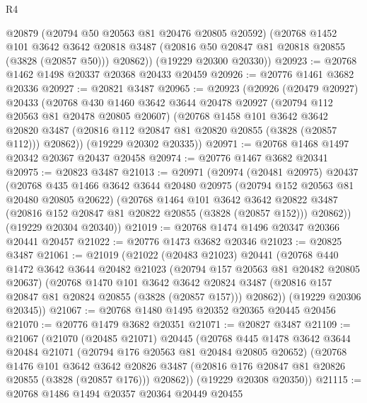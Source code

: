 \begin{lexlean}{R4}
\begin{coremodule}
        @20879
        (@20794 @50 @20563 @81 @20476 @20805 @20592)
        (@20768
          @1452
          @101
          @3642
          @3642
          @20818
          @3487
          (@20816 @50 @20847 @81 @20818 @20855 (@3828 (@20857 @50)))
          @20862))
      (@19229 @20300 @20330))
@20923 := @20768 @1462 @1498 @20337 @20368 @20433 @20459
@20926 := @20776 @1461 @3682 @20336
@20927 := @20821 @3487
@20965 := @20923
    (@20926
      (@20479 @20927)
      @20433
      (@20768
        @430
        @1460
        @3642
        @3644
        @20478
        @20927
        (@20794 @112 @20563 @81 @20478 @20805 @20607)
        (@20768
          @1458
          @101
          @3642
          @3642
          @20820
          @3487
          (@20816 @112 @20847 @81 @20820 @20855 (@3828 (@20857 @112)))
          @20862))
      (@19229 @20302 @20335))
@20971 := @20768 @1468 @1497 @20342 @20367 @20437 @20458
@20974 := @20776 @1467 @3682 @20341
@20975 := @20823 @3487
@21013 := @20971
    (@20974
      (@20481 @20975)
      @20437
      (@20768
        @435
        @1466
        @3642
        @3644
        @20480
        @20975
        (@20794 @152 @20563 @81 @20480 @20805 @20622)
        (@20768
          @1464
          @101
          @3642
          @3642
          @20822
          @3487
          (@20816 @152 @20847 @81 @20822 @20855 (@3828 (@20857 @152)))
          @20862))
      (@19229 @20304 @20340))
@21019 := @20768 @1474 @1496 @20347 @20366 @20441 @20457
@21022 := @20776 @1473 @3682 @20346
@21023 := @20825 @3487
@21061 := @21019
    (@21022
      (@20483 @21023)
      @20441
      (@20768
        @440
        @1472
        @3642
        @3644
        @20482
        @21023
        (@20794 @157 @20563 @81 @20482 @20805 @20637)
        (@20768
          @1470
          @101
          @3642
          @3642
          @20824
          @3487
          (@20816 @157 @20847 @81 @20824 @20855 (@3828 (@20857 @157)))
          @20862))
      (@19229 @20306 @20345))
@21067 := @20768 @1480 @1495 @20352 @20365 @20445 @20456
@21070 := @20776 @1479 @3682 @20351
@21071 := @20827 @3487
@21109 := @21067
    (@21070
      (@20485 @21071)
      @20445
      (@20768
        @445
        @1478
        @3642
        @3644
        @20484
        @21071
        (@20794 @176 @20563 @81 @20484 @20805 @20652)
        (@20768
          @1476
          @101
          @3642
          @3642
          @20826
          @3487
          (@20816 @176 @20847 @81 @20826 @20855 (@3828 (@20857 @176)))
          @20862))
      (@19229 @20308 @20350))
@21115 := @20768 @1486 @1494 @20357 @20364 @20449 @20455

\end{coremodule}
\end{lexlean}

